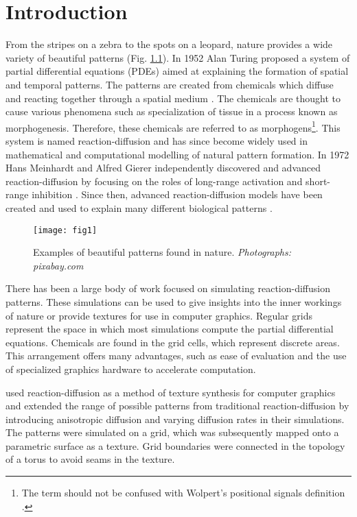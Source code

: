 \chapter{Introduction}
From the stripes on a zebra to the spots on a leopard, nature provides a wide variety of beautiful patterns (Fig. \ref{fig:naturalPatterns1}). In 1952 Alan Turing proposed a system of partial differential equations (PDEs) aimed at explaining the formation of spatial and temporal patterns. The patterns are created from chemicals which diffuse and reacting together through a spatial medium \citep{turing1952}. The chemicals are thought to cause various phenomena such as specialization of tissue in a process known as morphogenesis. Therefore, these chemicals are referred to as morphogens\footnote{The term  should not be confused with Wolpert’s positional signals definition \citep{wolpert1996}.}. This system is named reaction-diffusion and has since become widely used in mathematical and computational modelling of natural pattern formation. In 1972 Hans Meinhardt and Alfred Gierer independently discovered and advanced reaction-diffusion by focusing on the roles of long-range activation and short-range inhibition \citep{gierer1972}. Since then, advanced reaction-diffusion models have been created and used to explain many different biological patterns \citep{garzon2011, fowler1992, lefevre2010, meinhardt2009}.

\begin{figure}[H]
  \centering
  \texttt{[image: fig1]}
  \caption{Examples of beautiful patterns found in nature. \textit{Photographs: pixabay.com}}
  \label{fig:naturalPatterns1}
\end{figure}

There has been a large body of work focused on simulating reaction-diffusion patterns. These simulations can be used to give insights into the inner workings of nature or provide textures for use in computer graphics. Regular grids represent the space in which most simulations compute the partial differential equations. Chemicals are found in the grid cells, which represent discrete areas. This arrangement offers many advantages, such as ease of evaluation and the use of specialized graphics hardware to accelerate computation.

\citet{witkin1991} used reaction-diffusion as a method of texture synthesis for computer graphics and extended the range of possible patterns from traditional reaction-diffusion by introducing anisotropic diffusion and varying diffusion rates in their simulations. The patterns were simulated on a grid, which was subsequently mapped onto a parametric surface as a texture. Grid boundaries were connected in the topology of a torus to avoid seams in the texture.

